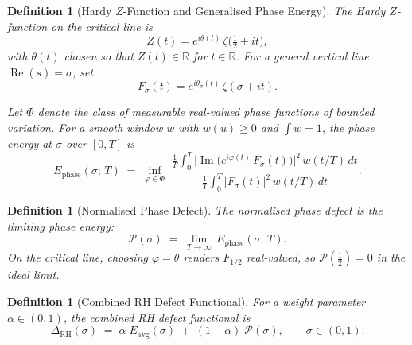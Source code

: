 \documentclass[11pt]{article}
\newtheorem{definition}[theorem]{Definition}
\theoremstyle{remark}
\DeclareMathOperator{\Ima}{Im}
\DeclareMathOperator{\Rea}{Re}
\begin{document}

\begin{definition}[Hardy $Z$-Function and Generalised Phase Energy]
\label{def:phase-energy}
The Hardy $Z$-function on the critical line is
\[
  Z(t) = e^{i\theta(t)}\,\zeta\!\bigl(\tfrac{1}{2}+it\bigr),
\]
with $\theta(t)$ chosen so that $Z(t)\in\mathbb{R}$ for $t\in\mathbb{R}$.
For a general vertical line $\Rea(s)=\sigma$, set
\[
  F_{\sigma}(t) = e^{i\theta_{\sigma}(t)}\,\zeta(\sigma+it).
\]

Let $\Phi$ denote the class of measurable real-valued phase functions
of bounded variation.  For a smooth window $w$ with $w(u)\geq 0$
and $\int w = 1$, the \emph{phase energy} at $\sigma$ over
$[0,T]$ is
\[
  E_{\mathrm{phase}}(\sigma;\,T)
  \;=\;
  \inf_{\varphi\in\Phi}\;
  \frac{\displaystyle
    \frac{1}{T}\int_{0}^{T}
      \bigl\lvert
        \Ima\!\bigl(e^{i\varphi(t)}\,F_{\sigma}(t)\bigr)
      \bigr\rvert^{2}\,
      w(t/T)\,dt}
  {\displaystyle
    \frac{1}{T}\int_{0}^{T}
      \bigl\lvert F_{\sigma}(t)\bigr\rvert^{2}\,
      w(t/T)\,dt}.
\]
\end{definition}

\begin{definition}[Normalised Phase Defect]
\label{def:phase-defect}
The \emph{normalised phase defect} is the limiting phase energy:
\[
  \mathcal{P}(\sigma)
  \;=\;
  \lim_{T\to\infty}\, E_{\mathrm{phase}}(\sigma;\,T).
\]
On the critical line, choosing $\varphi = \theta$ renders $F_{1/2}$
real-valued, so $\mathcal{P}(\tfrac{1}{2}) = 0$ in the ideal limit.
\end{definition}


\begin{definition}[Combined RH Defect Functional]
\label{def:delta-rh}
For a weight parameter $\alpha\in(0,1)$, the
\emph{combined RH defect functional} is
\[
  \boxed{\;
  \Delta_{\mathrm{RH}}(\sigma)
  \;=\;
  \alpha\; E_{\mathrm{avg}}(\sigma)
  \;+\;
  (1-\alpha)\;\mathcal{P}(\sigma),
  \qquad \sigma\in(0,1).
  \;}
\]
\end{definition}

\end{document}
